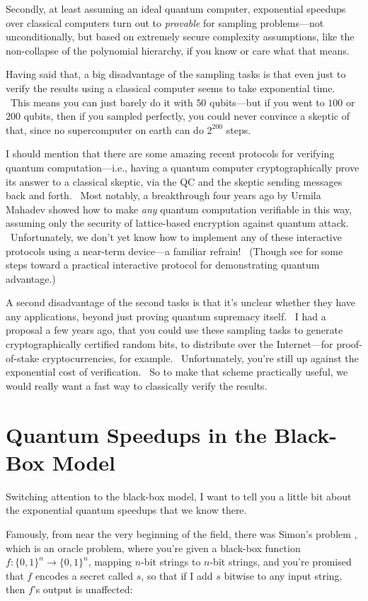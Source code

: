 \documentclass[11pt]{article}
\begin{document}
Secondly, at least assuming an ideal quantum computer, exponential speedups over classical computers turn out to \emph{provable} for sampling problems---not unconditionally, but based on extremely secure complexity assumptions, like the non-collapse of the polynomial hierarchy, if you know or care what that means.

Having said that, a big disadvantage of the sampling tasks is that even just to verify the results using a classical computer seems to take exponential time. \ This means you can just barely do it with $50$ qubits---but if you went to $100$ or $200$ qubits, then if you sampled perfectly, you could never convince a skeptic of that, since no supercomputer on earth can do $2^{200}$ steps.

I should mention that there are some amazing recent protocols for verifying quantum computation---i.e., having a quantum computer cryptographically prove its answer to a classical skeptic, via the QC and the skeptic sending messages back and forth. \ Most notably, a breakthrough four years ago by Urmila Mahadev \cite{mahadev} showed how to make \emph{any} quantum computation verifiable in this way, assuming only the security of lattice-based encryption against quantum attack. \ Unfortunately, we don't yet know how to implement any of these interactive protocols using a near-term device---a familiar refrain! \ (Though see \cite{kcvy} for some steps toward a practical interactive protocol for demonstrating quantum advantage.)

A second disadvantage of the second tasks is that it's unclear whether they have any applications, beyond just proving quantum supremacy itself. \ I had a proposal a few years ago, that you could use these sampling tasks to generate cryptographically certified random bits, to distribute over the Internet---for proof-of-stake cryptocurrencies, for example. \ Unfortunately, you're still up against the exponential cost of verification. \ So to make that scheme practically useful, we would really want a fast way to classically verify the results.


\section{Quantum Speedups in the Black-Box Model}

Switching attention to the black-box model, I want to tell you a little bit about the exponential quantum speedups that we know there.

Famously, from near the very beginning of the field, there was Simon's problem \cite{simon}, which is an oracle problem, where you're given a black-box function $f:\{0,1\}^n \rightarrow \{0,1\}^n$, mapping $n$-bit strings to $n$-bit strings, and you're promised that $f$ encodes a secret called $s$, so that if I add $s$ bitwise to any input string, then $f$'s output is unaffected:
\end{document}
